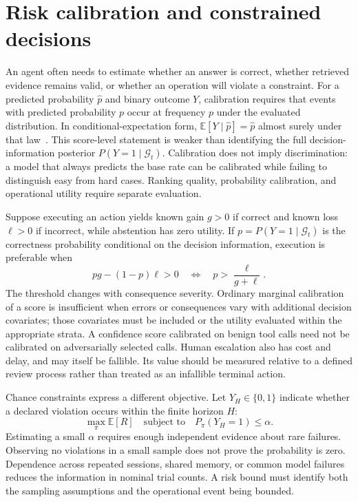 \section{Risk calibration and constrained decisions}\label{sec:C02:05}
An agent often needs to estimate whether an answer is correct, whether retrieved evidence remains valid, or whether an operation will violate a constraint. For a predicted probability $\hat p$ and binary outcome $Y$, calibration requires that events with predicted probability $p$ occur at frequency $p$ under the evaluated distribution. In conditional-expectation form, $\mathbb E[Y\mid\widehat p]=\widehat p$ almost surely under that law~\cite{ch02_calibration2017}. This score-level statement is weaker than identifying the full decision-information posterior $P(Y=1\mid\mathcal G_t)$. Calibration does not imply discrimination: a model that always predicts the base rate can be calibrated while failing to distinguish easy from hard cases. Ranking quality, probability calibration, and operational utility require separate evaluation.

Suppose executing an action yields known gain $g>0$ if correct and known loss $\ell>0$ if incorrect, while abstention has zero utility. If $p=P(Y=1\mid\mathcal G_t)$ is the correctness probability conditional on the decision information, execution is preferable when
\begin{equation}
 pg-(1-p)\ell>0
 \quad\Longleftrightarrow\quad p>\frac{\ell}{g+\ell}.
\end{equation}
The threshold changes with consequence severity. Ordinary marginal calibration of a score is insufficient when errors or consequences vary with additional decision covariates; those covariates must be included or the utility evaluated within the appropriate strata. A confidence score calibrated on benign tool calls need not be calibrated on adversarially selected calls. Human escalation also has cost and delay, and may itself be fallible. Its value should be measured relative to a defined review process rather than treated as an infallible terminal action.

Chance constraints express a different objective. Let $Y_H\in\{0,1\}$ indicate whether a declared violation occurs within the finite horizon $H$:
\begin{equation}
 \max_\pi\mathbb E[R]\quad\text{subject to}\quad
 P_\pi(Y_H=1)\leq\alpha.
\end{equation}
Estimating a small $\alpha$ requires enough independent evidence about rare failures. Observing no violations in a small sample does not prove the probability is zero. Dependence across repeated sessions, shared memory, or common model failures reduces the information in nominal trial counts. A risk bound must identify both the sampling assumptions and the operational event being bounded.

